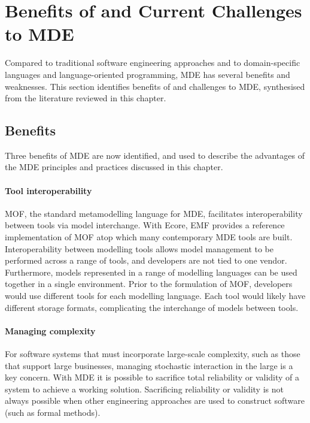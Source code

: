 
\section{Benefits of and Current Challenges to MDE}
\label{sec:mde_benefits_and_challenges}
Compared to traditional software engineering approaches and to domain-specific languages and language-oriented programming, MDE has several benefits and weaknesses. This section identifies benefits of and challenges to MDE, synthesised from the literature reviewed in this chapter.

\subsection{Benefits}
\label{subsec:mde_benefits}
Three benefits of MDE are now identified, and used to describe the advantages of the MDE principles and practices discussed in this chapter. 

\paragraph{Tool interoperability} MOF, the standard metamodelling language for MDE, facilitates interoperability between tools via model interchange. With Ecore, EMF provides a reference implementation of MOF atop which many contemporary MDE tools are built. Interoperability between modelling tools allows model management to be performed across a range of tools, and developers are not tied to one vendor. Furthermore, models represented in a range of modelling languages can be used together in a single environment. Prior to the formulation of MOF, developers would use different tools for each modelling language. Each tool would likely have different storage formats, complicating the interchange of models between tools.

\paragraph{Managing complexity} For software systems that must incorporate large-scale complexity, such as those that support large businesses, managing stochastic interaction in the large is a key concern. With MDE it is possible to sacrifice total reliability or validity of a system to achieve a working solution. Sacrificing reliability or validity is not always possible when other engineering approaches are used to construct software (such as formal methods).

